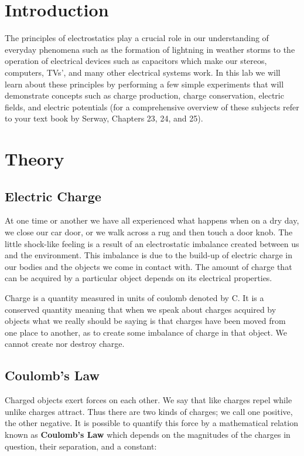 
\section{Introduction}
The principles of electrostatics play a crucial role in our
understanding of everyday phenomena such as the formation of
lightning in weather storms to the operation of electrical devices
such as capacitors which make our stereos, computers, TVs', and
many other electrical systems work.  In this lab we will learn
about these principles by performing a few simple experiments that
will demonstrate concepts such as charge production, charge
conservation, electric fields, and electric potentials (for a
comprehensive overview of these subjects refer to your text book
by Serway, Chapters 23, 24, and 25).

\section{Theory}
\subsection{Electric Charge}
At one time or another we have all experienced what happens when
on a dry day, we close our car door, or we walk across a rug and
then touch a door knob.  The little shock-like feeling is a result
of an electrostatic imbalance created between us and the
environment.   This imbalance is due to the build-up of electric
charge in our bodies and the objects we come in contact with. The
amount of charge that can be acquired by a particular object
depends on its electrical properties.

Charge is a quantity measured in units of coulomb denoted by C. It
is a conserved quantity meaning that when we speak about charges
acquired by objects what we really should be saying is that
charges have been moved from one place to another, as to create
some imbalance of charge in that object.  We cannot create nor
destroy charge.

\subsection{Coulomb's Law}
Charged objects exert forces on each other.  We say that like
charges repel while unlike charges attract.  Thus there are two
kinds of charges; we call one positive, the other negative.  It is
possible to quantify this force by a mathematical relation known
as {\bf{Coulomb's Law}} which depends on the magnitudes of the
charges in question, their separation, and a constant:

